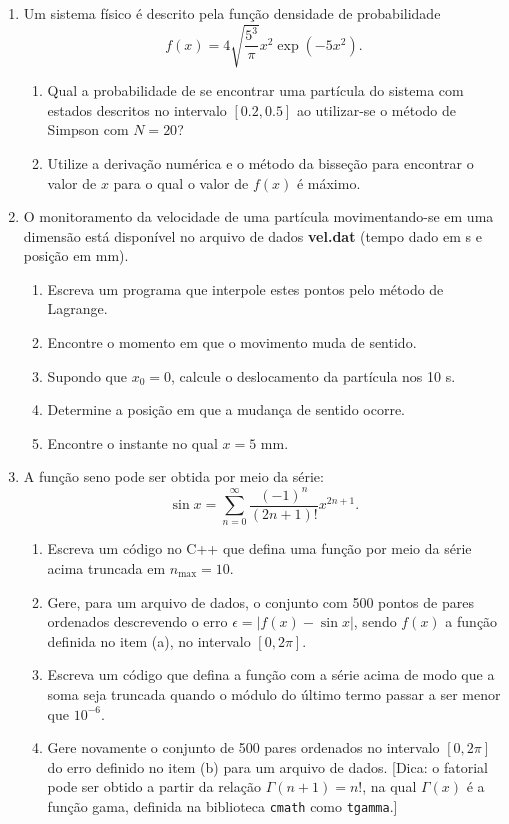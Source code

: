 \documentclass{article}
\begin{document}
\begin{enumerate}
    \item Um sistema físico é descrito pela função densidade de probabilidade
    \[
    f(x) = 4 \sqrt{\frac{5^3}{\pi}} x^2 \exp(-5x^2).
    \]
    \begin{enumerate}
        \item Qual a probabilidade de se encontrar uma partícula do sistema com estados descritos no intervalo \([0.2, 0.5]\) ao utilizar-se o método de Simpson com \( N = 20 \)?
        \item Utilize a derivação numérica e o método da bisseção para encontrar o valor de \( x \) para o qual o valor de \( f(x) \) é máximo.
    \end{enumerate}

    \item O monitoramento da velocidade de uma partícula movimentando-se em uma dimensão está disponível no arquivo de dados \textbf{vel.dat} (tempo dado em s e posição em mm). 
    \begin{enumerate}
        \item Escreva um programa que interpole estes pontos pelo método de Lagrange.
        \item Encontre o momento em que o movimento muda de sentido.
        \item Supondo que \( x_0 = 0 \), calcule o deslocamento da partícula nos 10 s.
        \item Determine a posição em que a mudança de sentido ocorre.
        \item Encontre o instante no qual \( x = 5 \) mm.
    \end{enumerate}

    \item A função seno pode ser obtida por meio da série:
    \[
    \sin x = \sum_{n=0}^{\infty} \frac{(-1)^n}{(2n+1)!} x^{2n+1}.
    \]
    \begin{enumerate}
        \item Escreva um código no C++ que defina uma função por meio da série acima truncada em \( n_{\text{max}} = 10 \).
        \item Gere, para um arquivo de dados, o conjunto com 500 pontos de pares ordenados descrevendo o erro \( \epsilon = |f(x) - \sin x| \), sendo \( f(x) \) a função definida no item (a), no intervalo \([0, 2\pi]\).
        \item Escreva um código que defina a função com a série acima de modo que a soma seja truncada quando o módulo do último termo passar a ser menor que \( 10^{-6} \).
        \item Gere novamente o conjunto de 500 pares ordenados no intervalo \([0, 2\pi]\) do erro definido no item (b) para um arquivo de dados. [Dica: o fatorial pode ser obtido a partir da relação \( \Gamma(n+1) = n! \), na qual \( \Gamma(x) \) é a função gama, definida na biblioteca \texttt{cmath} como \texttt{tgamma}.]
    \end{enumerate}
\end{enumerate}
\end{document}
